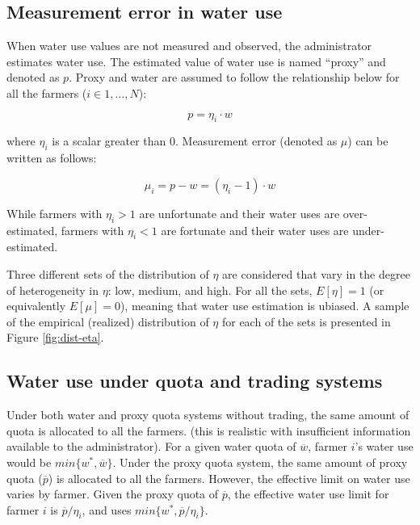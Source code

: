 \documentclass[
]{article}
\begin{document}
\subsection{Measurement error in water use}\label{measurement-error-in-water-use}

When water use values are not measured and observed, the administrator estimates water use. The estimated value of water use is named ``proxy'' and denoted as \(p\). Proxy and water are assumed to follow the relationship below for all the farmers (\(i \in 1,\dots, N\)):

\begin{equation}
p = \eta_i \cdot w
\end{equation}

where \(\eta_i\) is a scalar greater than 0. Measurement error (denoted as \(\mu\)) can be written as follows:

\begin{equation}
\mu_i = p - w = (\eta_i - 1)\cdot w
\end{equation}

While farmers with \(\eta_i > 1\) are unfortunate and their water uses are over-estimated, farmers with \(\eta_i < 1\) are fortunate and their water uses are under-estimated.

Three different sets of the distribution of \(\eta\) are considered that vary in the degree of heterogeneity in \(\eta\): low, medium, and high. For all the sets, \(E[\eta] = 1\) (or equivalently \(E[\mu] = 0\)), meaning that water use estimation is ubiased. A sample of the empirical (realized) distribution of \(\eta\) for each of the sets is presented in Figure \ref{fig:dist-eta}.

\subsection{Water use under quota and trading systems}\label{water-use-under-quota-and-trading-systems}

Under both water and proxy quota systems without trading, the same amount of quota is allocated to all the farmers. (this is realistic with insufficient information available to the administrator). For a given water quota of \(\overline{w}\), farmer \(i\)'s water use would be \(min\{w^*, \overline{w}\}\). Under the proxy quota system, the same amount of proxy quota (\(\overline{p}\)) is allocated to all the farmers. However, the effective limit on water use varies by farmer. Given the proxy quota of \(\overline{p}\), the effective water use limit for farmer \(i\) is \(\overline{p} / \eta_i\), and uses \(min\{w^*, \overline{p} / \eta_i\}\).
\end{document}
